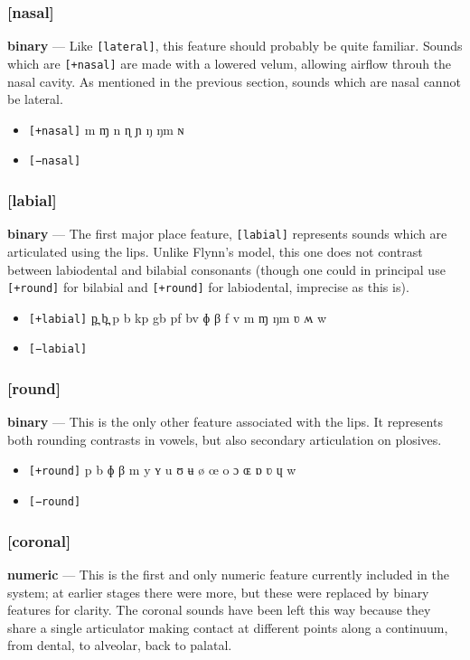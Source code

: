 \documentclass[10pt,letterpaper]{article}
\begin{document}
\subsubsection{[nasal]}
\label{ssub:feature_nasal}
\textbf{binary} — Like \texttt{[lateral]}, this feature should probably be quite familiar. Sounds which are \texttt{[+nasal]} are made with a lowered velum, allowing airflow throuh the nasal cavity. As mentioned in the previous section, sounds which are nasal cannot be lateral.

\begin{itemize}
\item \texttt{[+nasal]} m ɱ n ɳ ɲ ŋ ŋm ɴ 
\item \texttt{[−nasal]}
\end{itemize}

\subsubsection{[labial]}
\label{ssub:feature_labial}
\textbf{binary} — The first major place feature, \texttt{[labial]} represents sounds which are articulated using the lips. Unlike Flynn's model, this one does not contrast between labiodental and bilabial consonants (though one could in principal use \texttt{[+round]} for bilabial and \texttt{[+round]} for labiodental, imprecise as this is).

\begin{itemize}
\item \texttt{[+labial]} p̪ b̪ p b kp gb pf bv ɸ β f v m ɱ ŋm ʋ ʍ w 
\item \texttt{[−labial]}
\end{itemize}

\subsubsection{[round]}
\label{ssub:feature_round}
\textbf{binary} — This is the only other feature associated with the lips. It represents both rounding contrasts in vowels, but also secondary articulation on plosives.

\begin{itemize}
\item \texttt{[+round]} p b ɸ β m y ʏ u ʊ ʉ ø œ o ɔ ɶ ɒ ʋ ɥ w 
\item \texttt{[−round]}
\end{itemize}

\subsubsection{[coronal]}
\label{ssub:feature_coronal}
\textbf{numeric} — This is the first and only numeric feature currently included in the system; at earlier stages there were more, but these were replaced by binary features for clarity. The coronal sounds have been left this way because they share a single articulator making contact at different points along a continuum, from dental, to alveolar, back to palatal.
\end{document}
